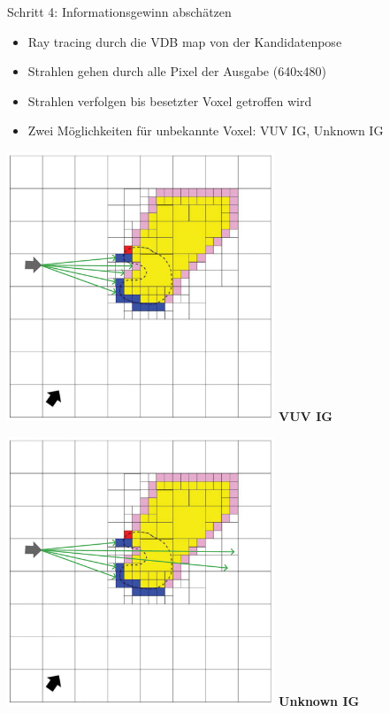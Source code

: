 \documentclass[aspectratio=169]{beamer}
\begin{document}
\begin{frame}{Schritt 4: Informationsgewinn abschätzen}
	\begin{block}{}
		\begin{itemize}
			\item Ray tracing durch die VDB map von der Kandidatenpose
			\item Strahlen gehen durch alle Pixel der Ausgabe (640x480)
			\item Strahlen verfolgen bis besetzter Voxel getroffen wird
			\item Zwei Möglichkeiten für unbekannte Voxel: VUV IG, Unknown IG
		\end{itemize}

	\end{block}
	\begin{minipage}{0.49\textwidth}
		\centering
		\includegraphics[width=0.6\textwidth]{Graphics/vuv_ig.pdf}
		\textbf{VUV IG}
	\end{minipage}
	\begin{minipage}{0.49\textwidth}
		\centering
		\includegraphics[width=0.6\textwidth]{Graphics/unknown_ig.pdf}
		\textbf{Unknown IG}
	\end{minipage}

\end{frame}
\end{document}
